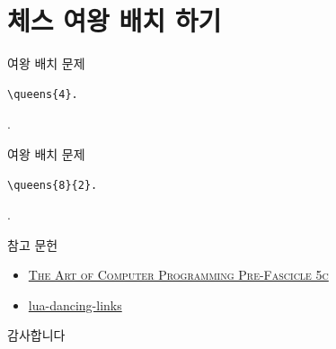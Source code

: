 \documentclass[xcolor=svgnames]{beamer}
\begin{document}
\section{체스 여왕 배치 하기}

%
\begin{frame}[fragile]{여왕 배치 문제}
\begin{verbatim}
\queens{4}.
\end{verbatim}
\vspace{-10mm}
.
\end{frame}

%
\begin{frame}[fragile]{여왕 배치 문제}
\begin{verbatim}
\queens{8}{2}.
\end{verbatim}
\vspace{-10mm}
.
\end{frame}


%
\begin{frame}{참고 문헌}
  \begin{itemize}
  \item \href{http://www-cs-faculty.stanford.edu/~knuth/fasc5c.ps.gz}
    {\textsc{The Art of Computer Programming Pre-Fascicle 5c}}
  \item \href{https://github.com/sjnam/lua-dancing-links}
    {lua-dancing-links}
  \end{itemize}
\end{frame}

%
\begin{frame}[standout]
  감사합니다
\end{frame}
\end{document}
